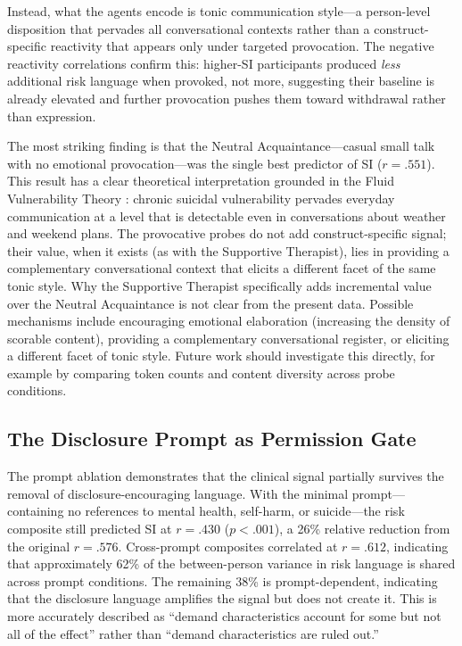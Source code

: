 \documentclass[review,12pt,authoryear]{elsarticle}
\begin{document}
Instead, what the agents encode is tonic communication style---a person-level disposition that pervades all conversational contexts rather than a construct-specific reactivity that appears only under targeted provocation. The negative reactivity correlations confirm this: higher-SI participants produced \textit{less} additional risk language when provoked, not more, suggesting their baseline is already elevated and further provocation pushes them toward withdrawal rather than expression.

The most striking finding is that the Neutral Acquaintance---casual small talk with no emotional provocation---was the single best predictor of SI ($r = .551$). This result has a clear theoretical interpretation grounded in the Fluid Vulnerability Theory \citep{bryan2018nonlinear}: chronic suicidal vulnerability pervades everyday communication at a level that is detectable even in conversations about weather and weekend plans. The provocative probes do not add construct-specific signal; their value, when it exists (as with the Supportive Therapist), lies in providing a complementary conversational context that elicits a different facet of the same tonic style. Why the Supportive Therapist specifically adds incremental value over the Neutral Acquaintance is not clear from the present data. Possible mechanisms include encouraging emotional elaboration (increasing the density of scorable content), providing a complementary conversational register, or eliciting a different facet of tonic style. Future work should investigate this directly, for example by comparing token counts and content diversity across probe conditions.

\subsection{The Disclosure Prompt as Permission Gate}

The prompt ablation demonstrates that the clinical signal partially survives the removal of disclosure-encouraging language. With the minimal prompt---containing no references to mental health, self-harm, or suicide---the risk composite still predicted SI at $r = .430$ ($p < .001$), a 26\% relative reduction from the original $r = .576$. Cross-prompt composites correlated at $r = .612$, indicating that approximately 62\% of the between-person variance in risk language is shared across prompt conditions. The remaining 38\% is prompt-dependent, indicating that the disclosure language amplifies the signal but does not create it. This is more accurately described as ``demand characteristics account for some but not all of the effect'' rather than ``demand characteristics are ruled out.''
\end{document}
